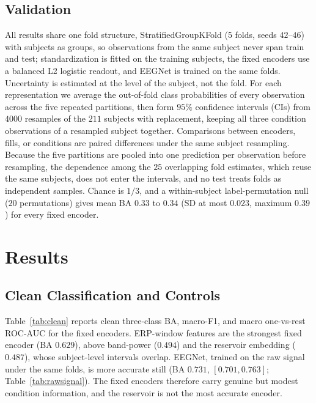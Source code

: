 \documentclass[conference]{IEEEtran}
\begin{document}
\subsection{Validation}
All results share one fold structure, StratifiedGroupKFold (5 folds, seeds $42$--$46$) with subjects as groups, so observations from the same subject never span train and test; standardization is fitted on the training subjects, the fixed encoders use a balanced L2 logistic readout, and EEGNet is trained on the same folds. Uncertainty is estimated at the level of the subject, not the fold. For each representation we average the out-of-fold class probabilities of every observation across the five repeated partitions, then form $95\%$ confidence intervals (CIs) from $4000$ resamples of the $211$ subjects with replacement, keeping all three condition observations of a resampled subject together. Comparisons between encoders, fills, or conditions are paired differences under the same subject resampling. Because the five partitions are pooled into one prediction per observation before resampling, the dependence among the $25$ overlapping fold estimates, which reuse the same subjects, does not enter the intervals, and no test treats folds as independent samples. Chance is $1/3$, and a within-subject label-permutation null ($20$ permutations) gives mean BA $0.33$ to $0.34$ (SD at most $0.023$, maximum $0.39$) for every fixed encoder.

\section{Results}
\subsection{Clean Classification and Controls}
\label{sec:clean}
Table~\ref{tab:clean} reports clean three-class BA, macro-F1, and macro one-vs-rest ROC-AUC for the fixed encoders. ERP-window features are the strongest fixed encoder (BA $0.629$), above band-power ($0.494$) and the reservoir embedding ($0.487$), whose subject-level intervals overlap. EEGNet, trained on the raw signal under the same folds, is more accurate still (BA $0.731$, $[0.701,0.763]$; Table~\ref{tab:rawsignal}). The fixed encoders therefore carry genuine but modest condition information, and the reservoir is not the most accurate encoder.
\end{document}
